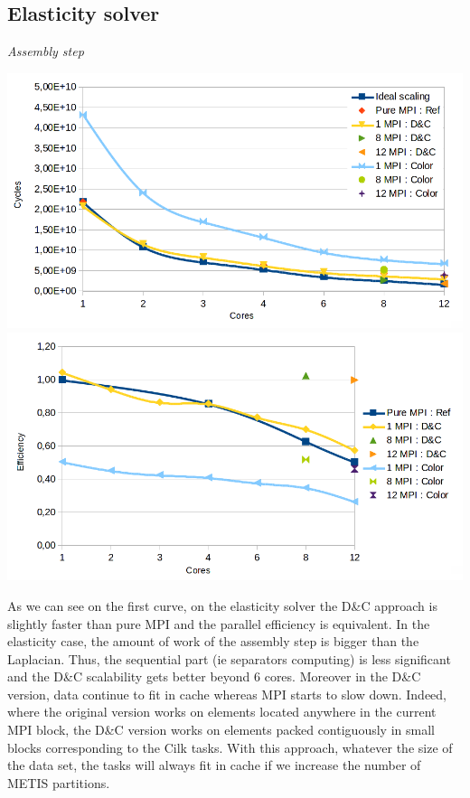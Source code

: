 \documentclass{IOS-Book-Article}
\begin{document}
\subsection{Elasticity solver}
\emph{Assembly step}
\begin{center}
 \includegraphics[scale=0.2]{Elasticity_asm_time.png}
 \includegraphics[scale=0.2]{Elasticity_asm_efficiency.png}
\end{center}
As we can see on the first curve, on the elasticity solver the D\&C approach is slightly faster than pure MPI and the parallel efficiency is equivalent.
In the elasticity case, the amount of work of the assembly step is bigger than the Laplacian.
Thus, the sequential part (ie separators computing) is less significant and the D\&C scalability gets better beyond 6 cores.
Moreover in the D\&C version, data continue to fit in cache whereas MPI starts to slow down. Indeed, where the original version works on elements located
anywhere in the current MPI block, the D\&C version works on elements packed contiguously in small blocks corresponding to the Cilk tasks.
With this approach, whatever the size of the data set, the tasks will always fit in cache if we increase the number of METIS partitions.\\
\end{document}

